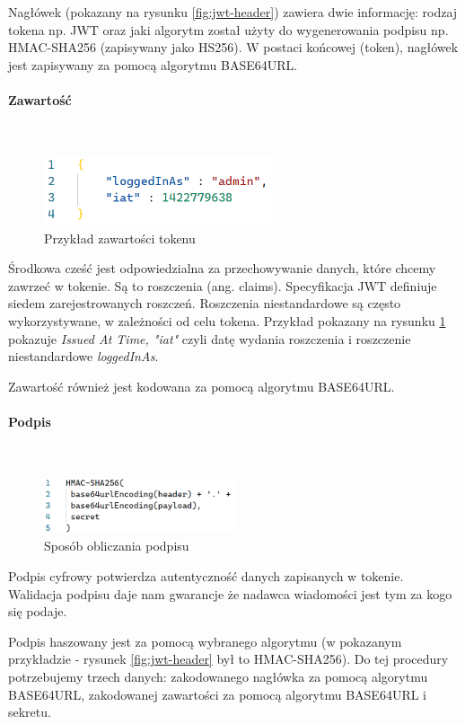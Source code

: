 \documentclass[12pt]{article}
\newcommand{\myparagraph}[1]{\paragraph{#1}\mbox{}\\}
\numberwithin{figure}{section}
\begin{document}
\begin{sloppypar}
    Nagłówek (pokazany na rysunku \ref{fig:jwt-header}) zawiera dwie informację: rodzaj tokena np. JWT oraz jaki algorytm został użyty do wygenerowania podpisu np. HMAC-SHA256 (zapisywany jako HS256). W postaci końcowej (token), nagłówek jest zapisywany za pomocą algorytmu BASE64URL.
    
    \myparagraph{Zawartość}
    \begin{figure}[H] 
     	\centering
    	\includegraphics[width=0.6\textwidth]{images/chapter_3/jwt-payload.png}
    	\caption{Przykład zawartości tokenu}
    	\label{fig:jwt-payload}
    \end{figure}
    
    Środkowa cześć jest odpowiedzialna za przechowywanie danych, które chcemy zawrzeć w tokenie. Są to roszczenia (ang. claims). Specyfikacja JWT definiuje siedem zarejestrowanych roszczeń. Roszczenia niestandardowe są często wykorzystywane, w zależności od celu tokena.
    Przykład pokazany na rysunku \ref{fig:jwt-payload} pokazuje \textit{Issued At Time, "iat"} czyli datę wydania roszczenia i roszczenie niestandardowe \textit{loggedInAs}.
    
    Zawartość również jest kodowana za pomocą algorytmu BASE64URL.
    \myparagraph{Podpis}
    \label{signature}

    \begin{figure}[H] 
     	\centering
    	\includegraphics[width=0.5\textwidth]{images/chapter_3/jwt-signature.png}
    	\caption{Sposób obliczania podpisu}
    	\label{fig:jwt-signature}
    \end{figure}
    
    Podpis cyfrowy potwierdza autentyczność danych zapisanych w tokenie. Walidacja podpisu daje nam gwarancje że nadawca wiadomości jest tym za kogo się podaje.
    
    Podpis haszowany jest za pomocą wybranego algorytmu (w pokazanym przykładzie - rysunek \ref{fig:jwt-header} był to HMAC-SHA256). Do tej procedury potrzebujemy trzech danych: zakodowanego nagłówka za pomocą algorytmu BASE64URL, zakodowanej zawartości za pomocą algorytmu BASE64URL i sekretu. 
    

\end{sloppypar}
\end{document}
